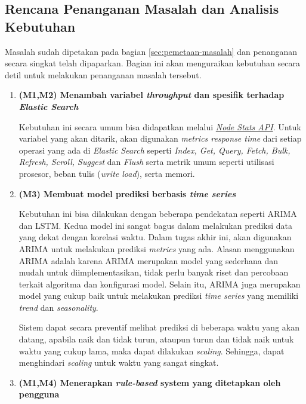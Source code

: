 \subsection{Rencana Penanganan Masalah dan Analisis Kebutuhan}

Masalah sudah dipetakan pada bagian \ref{sec:pemetaan-masalah} dan penanganan secara singkat telah dipaparkan. Bagian ini akan menguraikan kebutuhan secara detil untuk melakukan penanganan masalah tersebut.

\begin{enumerate}
    \item \textbf{(M1,M2) Menambah variabel \textit{throughput} dan spesifik terhadap \textit{Elastic Search}}
    
    Kebutuhan ini secara umum bisa didapatkan melalui \href{https://www.elastic.co/guide/en/elasticsearch/reference/current/cluster-nodes-stats.html}{\textit{Node Stats API}}. Untuk variabel yang akan ditarik, akan digunakan \textit{metrics response time} dari setiap operasi yang ada di \textit{Elastic Search} seperti \textit{Index, Get, Query, Fetch, Bulk, Refresh, Scroll, Suggest} dan \textit{Flush} serta metrik umum seperti utilisasi prosesor, beban tulis (\textit{write load}), serta memori.

    \item \textbf{(M3) Membuat model prediksi berbasis \textit{time series}}
    
    Kebutuhan ini bisa dilakukan dengan beberapa pendekatan seperti ARIMA dan LSTM. Kedua model ini sangat bagus dalam melakukan prediksi data yang dekat dengan korelasi waktu. Dalam tugas akhir ini, akan digunakan ARIMA untuk melakukan prediksi \textit{metrics} yang ada. Alasan menggunakan ARIMA adalah karena ARIMA merupakan model yang sederhana dan mudah untuk diimplementasikan, tidak perlu banyak riset dan percobaan terkait algoritma dan konfigurasi model. Selain itu, ARIMA juga merupakan model yang cukup baik untuk melakukan prediksi \textit{time series} yang memiliki \textit{trend} dan \textit{seasonality}.

    Sistem dapat secara preventif melihat prediksi di beberapa waktu yang akan datang, apabila naik dan tidak turun, ataupun turun dan tidak naik untuk waktu yang cukup lama, maka dapat dilakukan \textit{scaling}. Sehingga, dapat menghindari \textit{scaling} untuk waktu yang sangat singkat.

    \item \textbf{(M1,M4) Menerapkan \textit{rule-based} system yang ditetapkan oleh pengguna}
    

\end{enumerate}
